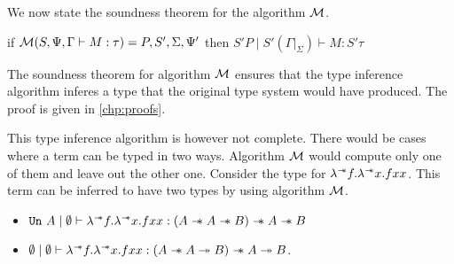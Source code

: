 We now state the soundness theorem for the algorithm $\M$.
\begin{theorem}[Soundness of $\M$]
  if $\mathcal{M}(S, \Psi, \Gamma \vdash M : \tau) = P, S', \Sigma, \Psi'$ then $S' P \mid S' (\Gamma |_\Sigma ) \vdash M : S' \tau$
\end{theorem}
The soundness theorem for algorithm $\M$ ensures that the type inference algorithm inferes a type that the original type system would have
produced. The proof is given in \cref{chp:proofs}.

This type inference algorithm is however not complete. There would be cases where a term can be typed in two ways.
Algorithm $\M$ would compute only one of them and leave out the other one. Consider the type for $\lambda^{\mathrel{-\mkern-6mu*}}f. \lambda^{\mathrel{-\mkern-6mu*}}x. f x x$.
This term can be inferred to have two types by using algorithm $\M$.
\begin{itemize}
  \item $\texttt{Un}\ A \mid \emptyset \vdash \lambda^{\sepimp}f. \lambda^{\sepimp}x. f x x: (A \sepimp A \sepimp B) \sepimp A \sepimp B$
  \item $\emptyset \mid \emptyset \vdash \lambda^{\mathrel{-\mkern-6mu*}}f. \lambda^{\mathrel{-\mkern-6mu*}}x. f x x: (A \mathrel{-\mkern-6mu*} A \twoheadrightarrow B) \mathrel{-\mkern-6mu*} A \twoheadrightarrow B$.
\end{itemize}

